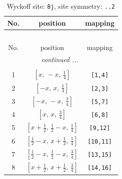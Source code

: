 \documentclass[fleqn,8pt]{jsarticle}
\begin{document}
\begin{longtable}{ccc}
\caption{Wyckoff site: {\tt 8j}, site symmetry: {\tt ..2}}
 \\
 \hline \hline
No. & position & mapping \\ \hline \endfirsthead

\multicolumn{2}{l}{\tablename\ \thetable{}} \\
 \hline \hline
No. & position & mapping \\ \hline \endhead

 \hline \hline
\multicolumn{2}{r}{\footnotesize\it continued ...} \\ \endfoot

 \hline \hline
\multicolumn{2}{r}{} \\ \endlastfoot

1 & $\left[ x,\, - x,\, \frac{1}{4} \right]$ & {\tt [1,4]} \\ \hline
2 & $\left[ - x,\, x,\, \frac{1}{4} \right]$ & {\tt [2,3]} \\ \hline
3 & $\left[ - x,\, - x,\, \frac{3}{4} \right]$ & {\tt [5,7]} \\ \hline
4 & $\left[ x,\, x,\, \frac{3}{4} \right]$ & {\tt [6,8]} \\ \hline
5 & $\left[ x + \frac{1}{2},\, \frac{1}{2} - x,\, \frac{1}{4} \right]$ & {\tt [9,12]} \\ \hline
6 & $\left[ \frac{1}{2} - x,\, x + \frac{1}{2},\, \frac{1}{4} \right]$ & {\tt [10,11]} \\ \hline
7 & $\left[ \frac{1}{2} - x,\, \frac{1}{2} - x,\, \frac{3}{4} \right]$ & {\tt [13,15]} \\ \hline
8 & $\left[ x + \frac{1}{2},\, x + \frac{1}{2},\, \frac{3}{4} \right]$ & {\tt [14,16]} \\
\end{longtable}
\renewcommand{\arraystretch}{1.2}
\end{document}
